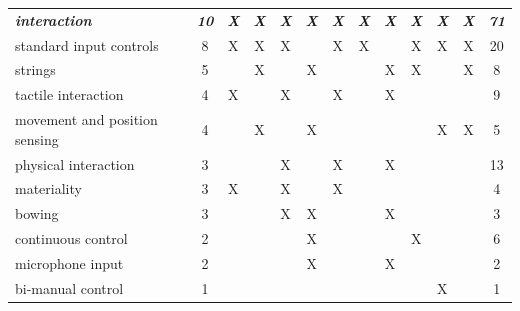 \documentclass[letterpaper, 12pt]{article}
\begin{document}
\vspace{3ex}

\begin{spacing}{1.1}
    \footnotesize
    \begin{supertabular}{L{5.5cm}cccccccccccc}
        \emph{\textbf{interaction}} & \emph{\textbf{10}} & \emph{\textbf{X}} & \emph{\textbf{X}} & \emph{\textbf{X}} & \emph{\textbf{X}} & \emph{\textbf{X}} & \emph{\textbf{X}} & \emph{\textbf{X}} & \emph{\textbf{X}} & \emph{\textbf{X}} & \emph{\textbf{X}} & \emph{\textbf{71}} \\
        standard input controls          & 8  & X & X & X &   & X & X &   & X & X & X & 20 \\
        strings                          & 5  &   & X &   & X &   &   & X & X &   & X & 8  \\
        tactile interaction              & 4  & X &   & X &   & X &   & X &   &   &   & 9  \\
        movement and position sensing    & 4  &   & X &   & X &   &   &   &   & X & X & 5  \\
        physical interaction             & 3  &   &   & X &   & X &   & X &   &   &   & 13 \\
        materiality                      & 3  & X &   & X &   & X &   &   &   &   &   & 4  \\
        bowing                           & 3  &   &   & X & X &   &   & X &   &   &   & 3  \\
        continuous control               & 2  &   &   &   & X &   &   &   & X &   &   & 6  \\
        microphone input                 & 2  &   &   &   & X &   &   & X &   &   &   & 2  \\
        bi-manual control                & 1  &   &   &   &   &   &   &   &   & X &   & 1  \\
        \hline


\end{supertabular}
\end{spacing}
\end{document}
